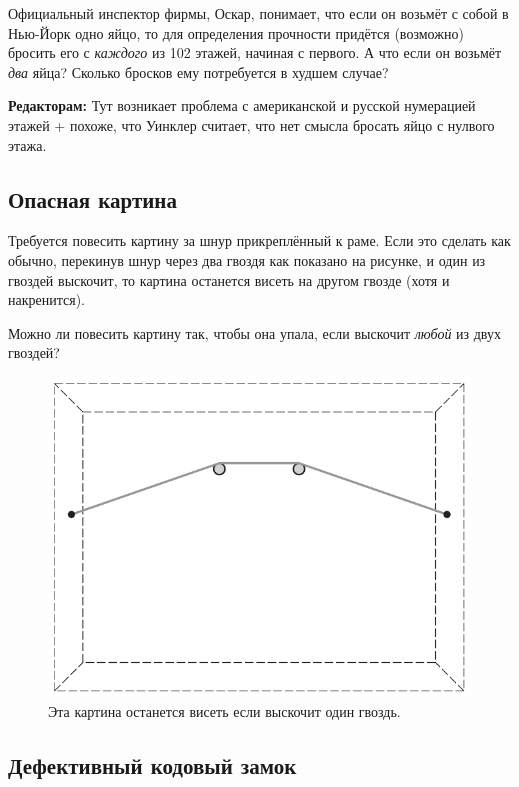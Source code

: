 Официальный инспектор фирмы, Оскар, понимает, что если он возьмёт с собой в Нью-Йорк одно яйцо,
то для определения прочности придётся (возможно) бросить его с \emph{каждого} из 102 %
этажей, начиная с первого.
А что если он возьмёт \emph{два} яйца?
Сколько бросков ему потребуется в худшем случае?

\begin{addedbytheeditors}
\textbf{Редакторам:}
Тут возникает проблема с американской и русской нумерацией этажей + похоже, что Уинклер считает, что нет смысла бросать яйцо с нулвого этажа.
\end{addedbytheeditors}


\subsection*{Опасная картина}

Требуется повесить картину за шнур прикреплённый к раме.
Если это сделать как обычно, перекинув шнур через два гвоздя как показано на рисунке, и один из гвоздей выскочит, то картина останется висеть на другом гвозде (хотя и накренится).

Можно ли повесить картину так, чтобы она упала, если выскочит \emph{любой} из двух гвоздей?

\begin{figure}[h!]
\centering
\includegraphics[scale=0.5]{pics/kartina1}
\caption{Эта картина останется висеть если выскочит один гвоздь.}
\label{pic:kartina1}
\end{figure}

\subsection*{Дефективный кодовый замок}\label{Дефективный кодовый замок}

